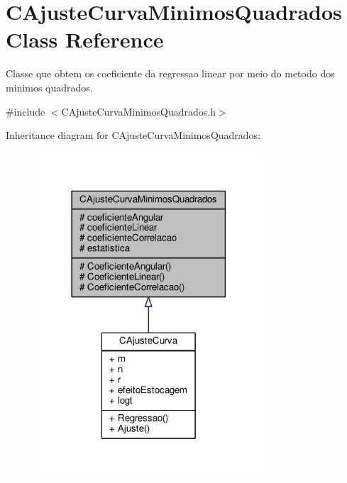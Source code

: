 \hypertarget{classCAjusteCurvaMinimosQuadrados}{\section{C\-Ajuste\-Curva\-Minimos\-Quadrados Class Reference}
\label{classCAjusteCurvaMinimosQuadrados}
}


Classe que obtem os coeficiente da regressao linear por meio do metodo dos minimos quadrados.  




{\ttfamily \#include $<$C\-Ajuste\-Curva\-Minimos\-Quadrados.\-h$>$}



Inheritance diagram for C\-Ajuste\-Curva\-Minimos\-Quadrados\-:
\nopagebreak
\begin{figure}[H]
\begin{center}
\leavevmode
\includegraphics[width=242pt]{classCAjusteCurvaMinimosQuadrados__inherit__graph}
\end{center}
\end{figure}


